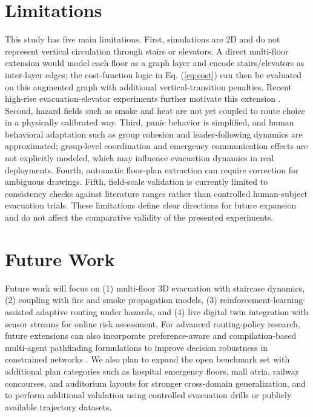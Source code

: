 \documentclass[journal]{IEEEtran}
\begin{document}
\section{Limitations}
This study has five main limitations. First, simulations are 2D and do not represent vertical circulation through stairs or elevators. A direct multi-floor extension would model each floor as a graph layer and encode stairs/elevators as inter-layer edges; the cost-function logic in Eq. (\ref{eq:cost}) can then be evaluated on this augmented graph with additional vertical-transition penalties. Recent high-rise evacuation-elevator experiments further motivate this extension \cite{mossberg2020elevator}. Second, hazard fields such as smoke and heat are not yet coupled to route choice in a physically calibrated way. Third, panic behavior is simplified, and human behavioral adaptation such as group cohesion and leader-following dynamics are approximated; group-level coordination and emergency communication effects are not explicitly modeled, which may influence evacuation dynamics in real deployments. Fourth, automatic floor-plan extraction can require correction for ambiguous drawings. Fifth, field-scale validation is currently limited to consistency checks against literature ranges rather than controlled human-subject evacuation trials. These limitations define clear directions for future expansion and do not affect the comparative validity of the presented experiments.

\section{Future Work}
Future work will focus on (1) multi-floor 3D evacuation with staircase dynamics, (2) coupling with fire and smoke propagation models, (3) reinforcement-learning-assisted adaptive routing under hazards, and (4) live digital twin integration with sensor streams for online risk assessment. For advanced routing-policy research, future extensions can also incorporate preference-aware and compilation-based multi-agent pathfinding formulations to improve decision robustness in constrained networks \cite{ho2022mapfpref,surynek2022mapfsurvey}. We also plan to expand the open benchmark set with additional plan categories such as hospital emergency floors, mall atria, railway concourses, and auditorium layouts for stronger cross-domain generalization, and to perform additional validation using controlled evacuation drills or publicly available trajectory datasets.
\end{document}
